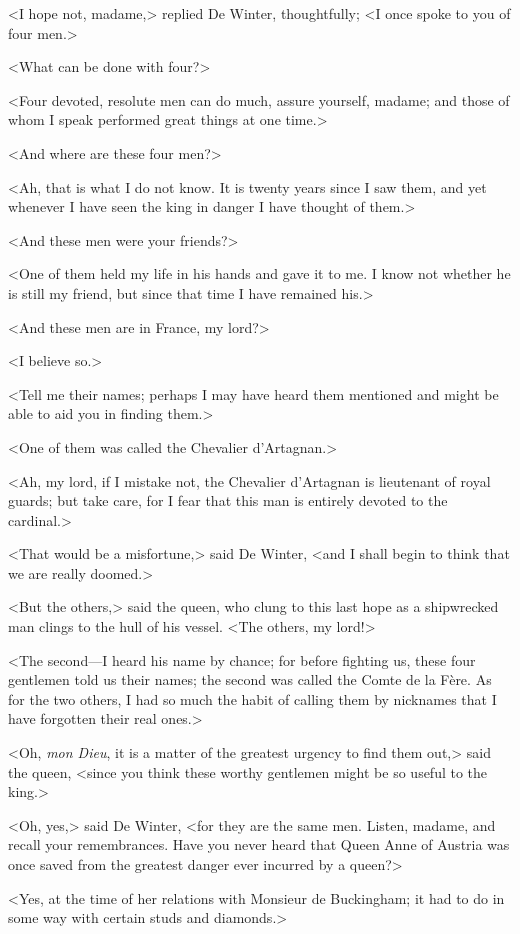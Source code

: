<I hope not, madame,> replied De Winter, thoughtfully; <I once spoke to you of four men.>

<What can be done with four?>

<Four devoted, resolute men can do much, assure yourself, madame; and those of whom I speak performed great things at one time.>

<And where are these four men?>

<Ah, that is what I do not know. It is twenty years since I saw them, and yet whenever I have seen the king in danger I have thought of them.>

<And these men were your friends?>

<One of them held my life in his hands and gave it to me. I know not whether he is still my friend, but since that time I have remained his.>

<And these men are in France, my lord?>

<I believe so.>

<Tell me their names; perhaps I may have heard them mentioned and might be able to aid you in finding them.>

<One of them was called the Chevalier d'Artagnan.>

<Ah, my lord, if I mistake not, the Chevalier d'Artagnan is lieutenant of royal guards; but take care, for I fear that this man is entirely devoted to the cardinal.>

<That would be a misfortune,> said De Winter, <and I shall begin to think that we are really doomed.>

<But the others,> said the queen, who clung to this last hope as a shipwrecked man clings to the hull of his vessel. <The others, my lord!>

<The second—I heard his name by chance; for before fighting us, these four gentlemen told us their names; the second was called the Comte de la Fère. As for the two others, I had so much the habit of calling them by nicknames that I have forgotten their real ones.>

<Oh, \textit{mon Dieu}, it is a matter of the greatest urgency to find them out,> said the queen, <since you think these worthy gentlemen might be so useful to the king.>

<Oh, yes,> said De Winter, <for they are the same men. Listen, madame, and recall your remembrances. Have you never heard that Queen Anne of Austria was once saved from the greatest danger ever incurred by a queen?>

<Yes, at the time of her relations with Monsieur de Buckingham; it had to do in some way with certain studs and diamonds.>


